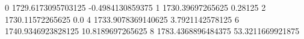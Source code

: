 0 1729.6173095703125 -0.4984130859375
1 1730.39697265625 0.28125
2 1730.11572265625 0.0
4 1733.9078369140625 3.7921142578125
6 1740.9346923828125 10.8189697265625
8 1783.4368896484375 53.3211669921875
